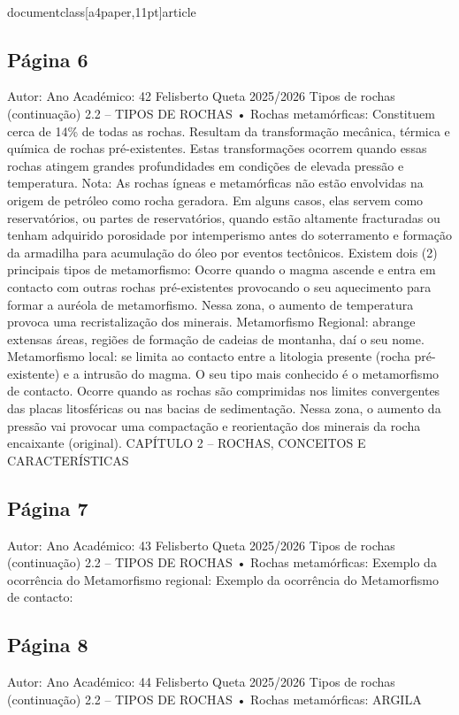 \\documentclass[a4paper,11pt]{article}
\begin{document}
\subsection*{Página 6}
Autor:
Ano Académico:
42
Felisberto Queta
2025/2026
Tipos de rochas (continuação)
2.2 – TIPOS DE ROCHAS
•
Rochas metamórficas:
Constituem cerca de 14\% de todas as rochas. Resultam da transformação mecânica, térmica e 
química de rochas pré-existentes. Estas transformações ocorrem quando essas rochas atingem 
grandes profundidades em condições de elevada pressão e temperatura.
Nota: As rochas ígneas e metamórficas não estão envolvidas na origem de petróleo como rocha geradora. Em alguns casos, elas 
servem como reservatórios, ou partes de reservatórios, quando estão altamente fracturadas ou tenham adquirido porosidade por 
intemperismo antes do soterramento e formação da armadilha para acumulação do óleo por eventos tectônicos.
Existem dois (2) principais tipos de metamorfismo: 
Ocorre quando o magma ascende e entra em contacto 
com outras rochas pré-existentes provocando o seu 
aquecimento para formar a auréola de metamorfismo. 
Nessa zona, o aumento de temperatura provoca uma 
recristalização dos minerais.
Metamorfismo Regional: abrange extensas 
áreas, regiões de formação de cadeias de montanha, 
daí o seu nome.
Metamorfismo local: se limita ao contacto entre a 
litologia presente (rocha pré-existente) e a intrusão do 
magma. O seu tipo mais conhecido é o metamorfismo 
de contacto.
Ocorre quando as rochas são comprimidas nos 
limites convergentes das placas litosféricas ou nas 
bacias de sedimentação. Nessa zona, o aumento da 
pressão vai provocar uma compactação e 
reorientação dos minerais da rocha encaixante 
(original).
CAPÍTULO 2 – ROCHAS, CONCEITOS E CARACTERÍSTICAS



\subsection*{Página 7}
Autor:
Ano Académico:
43
Felisberto Queta
2025/2026
Tipos de rochas (continuação)
2.2 – TIPOS DE ROCHAS
•
Rochas metamórficas:
Exemplo da ocorrência do 
Metamorfismo regional: 
Exemplo da ocorrência do 
Metamorfismo de contacto: 



\subsection*{Página 8}
Autor:
Ano Académico:
44
Felisberto Queta
2025/2026
Tipos de rochas (continuação)
2.2 – TIPOS DE ROCHAS
•
Rochas metamórficas:
ARGILA
\end{document}

